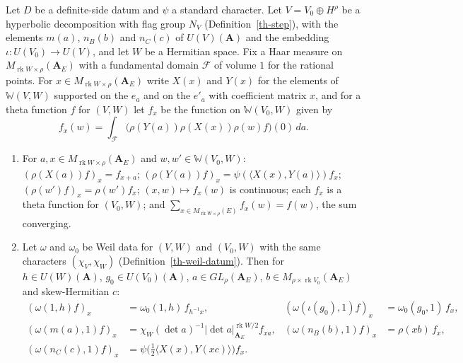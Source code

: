 \begin{lemma}\label{th-mixed-model}
Let $D$ be a definite-side datum and $\psi$ a standard character. Let
$V=V_0\oplus H^\rho$ be a hyperbolic decomposition with flag group $N_V$
(Definition~\ref{th-step}), with the elements $m(a)$, $n_B(b)$ and $n_C(c)$ of
$U(V)(\mathbf A)$ and the embedding $\iota\colon U(V_0)\to U(V)$, and let $W$ be
a Hermitian space. Fix a Haar measure on $M_{\operatorname{rk}W\times\rho}(\mathbf A_E)$
with a fundamental domain $\mathcal F$ of volume $1$ for the rational points.
For $x\in M_{\operatorname{rk}W\times\rho}(\mathbf A_E)$ write $X(x)$ and $Y(x)$
for the elements of $\mathbb W(V,W)$ supported on the $e_a$ and on the $e'_a$
with coefficient matrix $x$, and for a theta function $f$ for $(V,W)$ let $f_x$
be the function on $\mathbb W(V_0,W)$ given by
\[
f_x(w)=\int_{\mathcal F}\bigl(\rho(Y(a))\rho(X(x))\rho(w)f\bigr)(0)\,da .
\]
\begin{enumerate}
\item For $a,x\in M_{\operatorname{rk}W\times\rho}(\mathbf A_E)$ and $w,w'\in\mathbb W(V_0,W)$:
  $(\rho(X(a))f)_x=f_{x+a}$;
  $(\rho(Y(a))f)_x=\psi(\langle X(x),Y(a)\rangle)f_x$;
  $(\rho(w')f)_x=\rho(w')f_x$; $(x,w)\mapsto f_x(w)$ is continuous; each $f_x$
  is a theta function for $(V_0,W)$; and
  $\sum_{x\in M_{\operatorname{rk}W\times\rho}(E)}f_x(w)=f(w)$, the sum
  converging.
\item Let $\omega$ and $\omega_0$ be Weil data for $(V,W)$ and $(V_0,W)$ with the
  same characters $(\chi_V,\chi_W)$ (Definition~\ref{th-weil-datum}). Then for
  $h\in U(W)(\mathbf A)$, $g_0\in U(V_0)(\mathbf A)$, $a\in GL_\rho(\mathbf A_E)$,
  $b\in M_{\rho\times\operatorname{rk}V_0}(\mathbf A_E)$ and skew-Hermitian
  $c$:
  \begin{align*}
  (\omega(1,h)f)_x&=\omega_0(1,h)\,f_{h^{-1}x},&
  (\omega(\iota(g_0),1)f)_x&=\omega_0(g_0,1)\,f_x,\\
  (\omega(m(a),1)f)_x&=\chi_W(\det a)^{-1}|\det a|_{\mathbf A_E}^{\operatorname{rk}W/2}f_{xa},&
  (\omega(n_B(b),1)f)_x&=\rho(xb)\,f_x,\\
  (\omega(n_C(c),1)f)_x&=\psi\bigl(\tfrac12\langle X(x),Y(xc)\rangle\bigr)f_x .
  \end{align*}
\end{enumerate}
\end{lemma}
